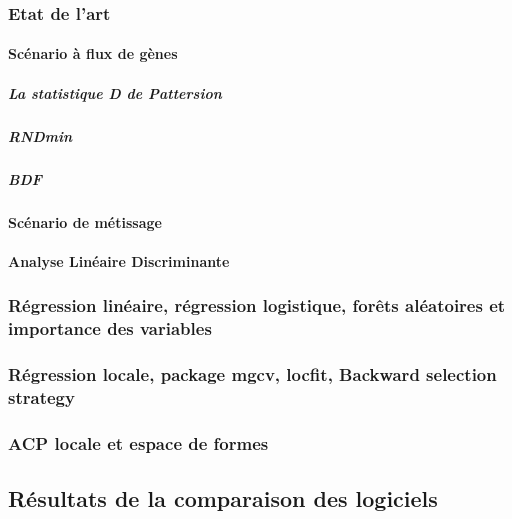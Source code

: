 \documentclass[12pt,twoside]{reedthesis}
\theoremstyle{definition}
\theoremstyle{definition}
\theoremstyle{remark}
\begin{document}
  \subsubsection{Etat de l'art}\label{etat-de-lart-1}
  
  \paragraph{Scénario à flux de gènes}\label{scenario-a-flux-de-genes}
  
  \subparagraph{La statistique D de
  Pattersion}\label{la-statistique-d-de-pattersion}
  
  \subparagraph{RNDmin}\label{rndmin}
  
  \subparagraph{BDF}\label{bdf}
  
  \paragraph{Scénario de métissage}\label{scenario-de-metissage}
  
  \paragraph{Analyse Linéaire
  Discriminante}\label{analyse-lineaire-discriminante}
  
  \subsubsection{Régression linéaire, régression logistique, forêts
  aléatoires et importance des
  variables}\label{regression-lineaire-regression-logistique-forets-aleatoires-et-importance-des-variables}
  
  \subsubsection{Régression locale, package mgcv, locfit, Backward
  selection
  strategy}\label{regression-locale-package-mgcv-locfit-backward-selection-strategy}
  
  \subsubsection{ACP locale et espace de
  formes}\label{acp-locale-et-espace-de-formes}
  
  \subsection{Résultats de la comparaison des
  logiciels}\label{resultats-de-la-comparaison-des-logiciels}
  
\end{document}
